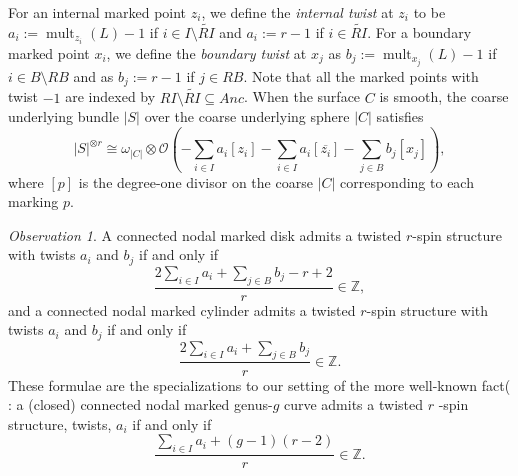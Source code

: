 \documentclass[11pt]{amsart}
\theoremstyle{definition}
\theoremstyle{remark}
\newtheorem{obs}[dummy]{Observation}
\newcommand{\<}{\left<}
\renewcommand{\>}{\right>}
\numberwithin{equation}{section}
\begin{document}
For an internal marked point $z_i$, we define the  \textit{internal twist} at $z_i$ to be $a_i:=\operatorname{mult}_{z_i}(L)-1$ if $i\in I\setminus \widetilde{RI}$
and $a_i:=r-1$ if $i\in \widetilde{RI}$. For a boundary marked point $x_i$, we define the  \textit{boundary twist} at $x_j$ as $b_j:=\operatorname{mult}_{x_j}(L)-1$ if $i\in B\setminus {RB}$ and as $b_j:=r-1$ if $j\in {RB}$. Note that all the marked points with twist $-1$ are indexed by $RI\setminus \widetilde{RI}\subseteq Anc$. When the surface $C$ is smooth, the coarse underlying bundle $|S|$ over the coarse underlying sphere $|C|$ %
satisfies
$$|S|^{\otimes r} \cong \omega_{|C|} \otimes {\mathcal{O}}\left(-\sum_{i \in I} a_i [z_i] - \sum_{i \in I} a_i [\overline{z_i}] - \sum_{j \in B} b_j[x_j]\right),$$
where $[p]$ %
is the degree-one divisor on the coarse $|C|$ corresponding to each marking $p$.


\begin{obs}
\label{obs rank open}
A connected nodal marked disk admits a twisted $r$-spin structure with twists $a_i$ and $b_j$ if and only if
\begin{equation}\label{eq mod r condition g=0}
\frac{2\sum_{i \in I} a_i + \sum_{j\in B} b_j -r+2}{r}\in \mathbb Z,
\end{equation}
and a connected nodal marked cylinder admits a twisted $r$-spin structure with twists $a_i$ and $b_j$ if and only if
\begin{equation}\label{eq mod r condition rk g=1}
\frac{2\sum_{i \in I} a_i + \sum_{j\in B} b_j}{r}\in \mathbb Z.
\end{equation}
These formulae are the specializations to our setting of the more %
well-known fact( \cite{Witten93}: a (closed) connected nodal marked genus-$g$ curve admits a twisted $r$%
-spin structure, twists, $a_i$ %
if and only if 
\begin{equation}\label{eq rank close}
\frac{\sum_{i\in I} a_i +(g-1)(r-2)}{r}\in {\mathbb{Z}}.
\end{equation}
\end{obs}
\end{document}
